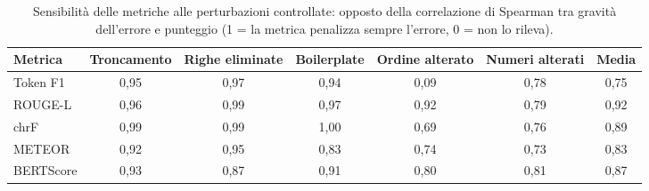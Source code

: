 \begin{table}[htbp]
  \centering
  \small
  \begin{tabular}{lcccccc}
    \toprule
    \textbf{Metrica} & \textbf{Troncamento} & \textbf{Righe eliminate} & \textbf{Boilerplate} & \textbf{Ordine alterato} & \textbf{Numeri alterati} & \textbf{Media} \\
    \midrule
    Token F1 & 0,95 & 0,97 & 0,94 & 0,09 & 0,78 & 0,75 \\
    ROUGE-L & 0,96 & 0,99 & 0,97 & 0,92 & 0,79 & 0,92 \\
    chrF & 0,99 & 0,99 & 1,00 & 0,69 & 0,76 & 0,89 \\
    METEOR & 0,92 & 0,95 & 0,83 & 0,74 & 0,73 & 0,83 \\
    BERTScore & 0,93 & 0,87 & 0,91 & 0,80 & 0,81 & 0,87 \\
    \bottomrule
  \end{tabular}
  \caption{Sensibilità delle metriche alle perturbazioni controllate: opposto della correlazione di Spearman tra gravità dell'errore e punteggio (1 = la metrica penalizza sempre l'errore, 0 = non lo rileva).}
  \label{tab:sensitivity}
\end{table}
